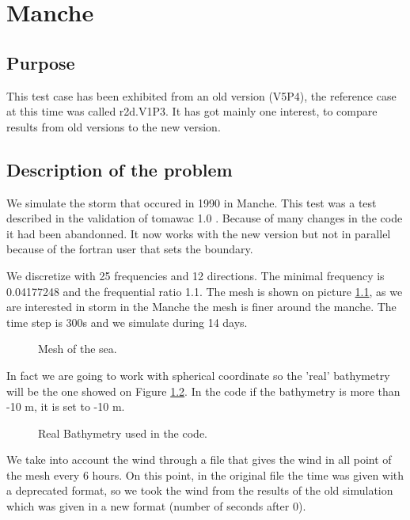 \chapter{Manche}
%
%
\section{Purpose}
%
This test case has been exhibited from an old version (V5P4), the reference case at this time was called r2d.V1P3. It has got mainly one interest, to compare results from old versions to the new version.  

%
\section{Description of the problem}
We simulate the storm that occured in 1990 in Manche. This test was a test described in the validation of tomawac 1.0 \cite{Benoit1996_3}. Because of many changes in the code it had been abandonned. It now works with the new version but not in parallel because of the fortran user that sets the boundary. 

We discretize with 25 frequencies and 12 directions. The minimal frequency is 0.04177248 and the frequential ratio 1.1.
The mesh is shown on picture \ref{figmanchemesh}, as we are interested in storm in the Manche the mesh is finer around the manche. 
The time step is 300s and we simulate during 14 days. 
\begin{figure} [!h]
\centering
{}
 \caption{Mesh of the sea. }
\label{figmanchemesh}
\end{figure}

In fact we are going to work with spherical coordinate so the 'real' bathymetry will be the one showed on Figure \ref{realbathymanche}. In the code if the bathymetry is more than -10 m, it is set to -10 m.
\begin{figure} [!h]
\centering
{}
 \caption{Real Bathymetry used in the code.}
\label{realbathymanche}
\end{figure}

We take into account the wind through a file that gives the wind in all point of the mesh every 6 hours. On this point, in the original file the time was given with a deprecated format, so we took the wind from the results of the old simulation which was given in a new format (number of seconds after 0).

